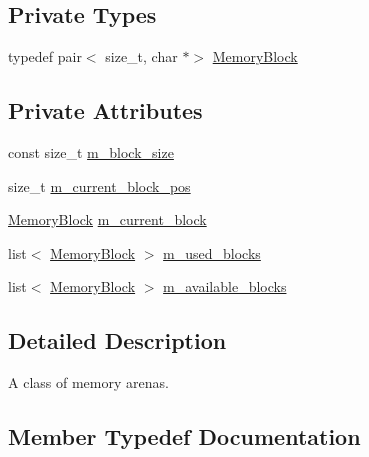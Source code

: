 \subsection*{Private Types}
\begin{DoxyCompactItemize}
\item 
typedef pair$<$ size\+\_\+t, char $\ast$$>$ \hyperlink{classmage_1_1_memory_arena_a6026a114bb2ecc405dd5ebf54e4c12d5}{Memory\+Block}
\end{DoxyCompactItemize}
\subsection*{Private Attributes}
\begin{DoxyCompactItemize}
\item 
const size\+\_\+t \hyperlink{classmage_1_1_memory_arena_a18177c245b045c5536330ffed284ed4d}{m\+\_\+block\+\_\+size}
\item 
size\+\_\+t \hyperlink{classmage_1_1_memory_arena_a880d07eb372ce1c8b907947fcbdfc59c}{m\+\_\+current\+\_\+block\+\_\+pos}
\item 
\hyperlink{classmage_1_1_memory_arena_a6026a114bb2ecc405dd5ebf54e4c12d5}{Memory\+Block} \hyperlink{classmage_1_1_memory_arena_a2680b25146c174ac7fd639f1bd0acc7c}{m\+\_\+current\+\_\+block}
\item 
list$<$ \hyperlink{classmage_1_1_memory_arena_a6026a114bb2ecc405dd5ebf54e4c12d5}{Memory\+Block} $>$ \hyperlink{classmage_1_1_memory_arena_a37891872cff5b86bb1f9c40b4450b904}{m\+\_\+used\+\_\+blocks}
\item 
list$<$ \hyperlink{classmage_1_1_memory_arena_a6026a114bb2ecc405dd5ebf54e4c12d5}{Memory\+Block} $>$ \hyperlink{classmage_1_1_memory_arena_a74c0d5d40bb402ec52bb23b7ccb9fec5}{m\+\_\+available\+\_\+blocks}
\end{DoxyCompactItemize}


\subsection{Detailed Description}
A class of memory arenas. 

\subsection{Member Typedef Documentation}
\hypertarget{classmage_1_1_memory_arena_a6026a114bb2ecc405dd5ebf54e4c12d5}{}\label{classmage_1_1_memory_arena_a6026a114bb2ecc405dd5ebf54e4c12d5} 
